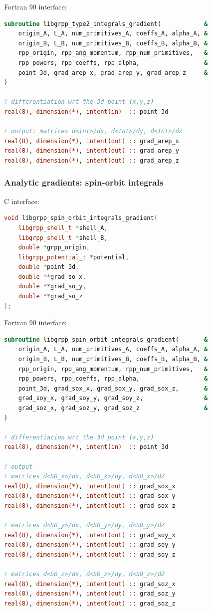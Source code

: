\documentclass[12pt]{article}
\begin{document}
\noindent
Fortran 90 interface:

\begin{lstlisting}[language=Fortran]
subroutine libgrpp_type2_integrals_gradient(            &
    origin_A, L_A, num_primitives_A, coeffs_A, alpha_A, &
    origin_B, L_B, num_primitives_B, coeffs_B, alpha_B, &
    rpp_origin, rpp_ang_momentum, rpp_num_primitives,   &
    rpp_powers, rpp_coeffs, rpp_alpha,                  &
    point_3d, grad_arep_x, grad_arep_y, grad_arep_z     &
)

! differentiation wrt the 3d point (x,y,z)
real(8), dimension(*), intent(in)  :: point_3d

! output: matrices d<Int>/dx, d<Int>/dy, d<Int>/dZ
real(8), dimension(*), intent(out) :: grad_arep_x
real(8), dimension(*), intent(out) :: grad_arep_y
real(8), dimension(*), intent(out) :: grad_arep_z
\end{lstlisting}

\subsubsection{Analytic gradients: spin-orbit integrals}
\label{sec:spin-orbit-grad}

C interface:

\begin{lstlisting}[language=C++]
void libgrpp_spin_orbit_integrals_gradient(
    libgrpp_shell_t *shell_A,
    libgrpp_shell_t *shell_B,
    double *grpp_origin,
    libgrpp_potential_t *potential,
    double *point_3d,
    double **grad_so_x,
    double **grad_so_y,
    double **grad_so_z
);
\end{lstlisting}

\noindent
Fortran 90 interface:

\begin{lstlisting}[language=Fortran]
subroutine libgrpp_spin_orbit_integrals_gradient(       &
    origin_A, L_A, num_primitives_A, coeffs_A, alpha_A, &
    origin_B, L_B, num_primitives_B, coeffs_B, alpha_B, &
    rpp_origin, rpp_ang_momentum, rpp_num_primitives,   &
    rpp_powers, rpp_coeffs, rpp_alpha,                  &
    point_3d, grad_sox_x, grad_sox_y, grad_sox_z,       &
    grad_soy_x, grad_soy_y, grad_soy_z,                 &
    grad_soz_x, grad_soz_y, grad_soz_z                  &
)

! differentiation wrt the 3d point (x,y,z)
real(8), dimension(*), intent(in)  :: point_3d

! output
! matrices d<SO_x>/dx, d<SO_x>/dy, d<SO_x>/dZ
real(8), dimension(*), intent(out) :: grad_sox_x
real(8), dimension(*), intent(out) :: grad_sox_y
real(8), dimension(*), intent(out) :: grad_sox_z

! matrices d<SO_y>/dx, d<SO_y>/dy, d<SO_y>/dZ
real(8), dimension(*), intent(out) :: grad_soy_x
real(8), dimension(*), intent(out) :: grad_soy_y
real(8), dimension(*), intent(out) :: grad_soy_z

! matrices d<SO_z>/dx, d<SO_z>/dy, d<SO_z>/dZ
real(8), dimension(*), intent(out) :: grad_soz_x
real(8), dimension(*), intent(out) :: grad_soz_y
real(8), dimension(*), intent(out) :: grad_soz_z
\end{lstlisting}
\end{document}
